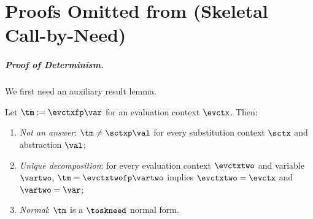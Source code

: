 
\section{Proofs Omitted from  (Skeletal Call-by-Need)}
\label{sect:app-skeletal}

\subparagraph{Proof of Determinism.}
We first need an auxiliary result lemma.
\begin{lemma}
	\label{l:CbNeedEvCtx}
	Let $\tm:=\evctxfp\var$ for an evaluation context $\evctx$. Then:
	\begin{enumerate}
		\item \label{p:CbNeedEvCtx-1} \emph{Not an answer}: $\tm\neq\sctxp\val$ for every substitution context $\sctx$ and abstraction $\val$;
		\item \label{p:CbNeedEvCtx-2} \emph{Unique decomposition}: for every evaluation context $\evctxtwo$ and variable $\vartwo$, $\tm=\evctxtwofp\vartwo$ implies $\evctxtwo=\evctx$ and $\vartwo=\var$;
		\item \label{p:CbNeedEvCtx-3} \emph{Normal}: $\tm$ is a $\toskneed$ normal form.
	\end{enumerate}
\end{lemma}
